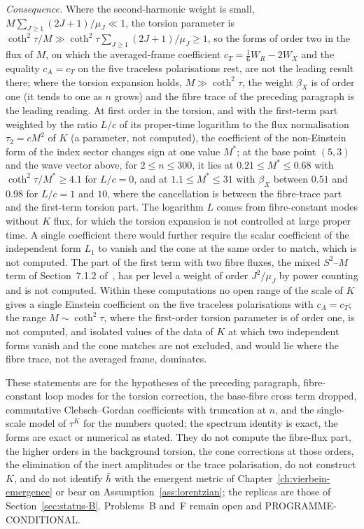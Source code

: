 \emph{Consequence.} Where the second-harmonic weight is small, \(M\sum_{J\ge1}(2J+1)/\mu_J\ll1\), the torsion parameter is \(\coth^2\tau/M\gg\coth^2\tau\sum_{J\ge1}(2J+1)/\mu_J\ge1\), so the forms of order two in the flux of \(M\), on which the averaged-frame coefficient \(c_T=\tfrac16W_R-2W_X\) and the equality \(c_A=c_T\) on the five traceless polarisations rest, are not the leading result there; where the torsion expansion holds, \(M\gg\coth^2\tau\), the weight \(\beta_X\) is of order one (it tends to one as \(n\) grows) and the fibre trace of the preceding paragraph is the leading reading. At first order in the torsion, and with the first-term part weighted by the ratio \(L/c\) of its proper-time logarithm to the flux normalisation \(\tau_2=cM^2\) of \(K\) (a parameter, not computed), the coefficient of the non-Einstein form of the index sector changes sign at one value \(M^*\); at the base point \((5,3)\) and the wave vector above, for \(2\le n\le300\), it lies at \(0.21\le M^*\le0.68\) with \(\coth^2\tau/M^*\ge4.1\) for \(L/c=0\), and at \(1.1\le M^*\le31\) with \(\beta_X\) between \(0.51\) and \(0.98\) for \(L/c=1\) and \(10\), where the cancellation is between the fibre-trace part and the first-term torsion part. The logarithm \(L\) comes from fibre-constant modes without \(K\) flux, for which the torsion expansion is not controlled at large proper time. A single coefficient there would further require the scalar coefficient of the independent form \(L_1\) to vanish and the cone at the same order to match, which is not computed. The part of the first term with two fibre fluxes, the mixed \(S^2\)--\(M\) term of Section~7.1.2 of~\cite{Steinacker2023}, has per level a weight of order \(J^2/\mu_J\) by power counting and is not computed. Within these computations no open range of the scale of \(K\) gives a single Einstein coefficient on the five traceless polarisations with \(c_A=c_T\); the range \(M\sim\coth^2\tau\), where the first-order torsion parameter is of order one, is not computed, and isolated values of the data of \(K\) at which two independent forms vanish and the cone matches are not excluded, and would lie where the fibre trace, not the averaged frame, dominates.

These statements are for the hypotheses of the preceding paragraph, fibre-constant loop modes for the torsion correction, the base-fibre cross term dropped, commutative Clebsch--Gordan coefficients with truncation at \(n\), and the single-scale model of \(\tau^K\) for the numbers quoted; the spectrum identity is exact, the forms are exact or numerical as stated. They do not compute the fibre-flux part, the higher orders in the background torsion, the cone corrections at those orders, the elimination of the inert amplitudes or the trace polarisation, do not construct \(K\), and do not identify \(\bar h\) with the emergent metric of Chapter~\ref{ch:vierbein-emergence} or bear on Assumption~\ref{ass:lorentzian}; the replicas are those of Section~\ref{sec:status-B}. Problems~B and~F remain open and PROGRAMME-CONDITIONAL.

